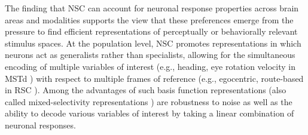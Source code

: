 

The finding that \ac{NSC} can account for neuronal response properties across
brain areas and modalities supports the view that these 
preferences emerge from the pressure to find efficient representations
of perceptually or behaviorally relevant stimulus spaces.
At the population level, \ac{NSC} promotes representations in which
neurons act as generalists rather than specialists,
allowing for the simultaneous encoding of multiple variables of interest
(e.g., heading, eye rotation velocity in \ac{MSTd} \citep{Beyeler2016})
with respect to multiple frames of reference
(e.g., egocentric, route-based in \ac{RSC} \citep{Rounds2016}).
Among the advantages of such basis function representations
\citep{Poggio1990,PougetSejnowski1997,PougetSnyder2000}
(also called mixed-selectivity representations
\citep{Eichenbaum2017,Fusi2016,Barak2013})
are robustness to noise as well as the ability to decode various variables of interest
by taking a linear combination of neuronal responses.

